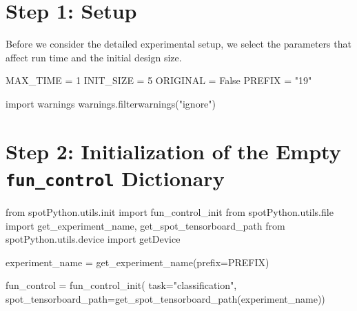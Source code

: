 \documentclass[
  letterpaper,
  DIV=11,
  numbers=noendperiod]{scrreprt}
\newenvironment{Shaded}{\begin{snugshade}}{\end{snugshade}}
\newcommand{\BuiltInTok}[1]{\textcolor[rgb]{0.00,0.23,0.31}{#1}}
\newcommand{\DecValTok}[1]{\textcolor[rgb]{0.68,0.00,0.00}{#1}}
\newcommand{\ImportTok}[1]{\textcolor[rgb]{0.00,0.46,0.62}{#1}}
\newcommand{\NormalTok}[1]{\textcolor[rgb]{0.00,0.23,0.31}{#1}}
\newcommand{\OperatorTok}[1]{\textcolor[rgb]{0.37,0.37,0.37}{#1}}
\newcommand{\StringTok}[1]{\textcolor[rgb]{0.13,0.47,0.30}{#1}}
\newcommand{\VariableTok}[1]{\textcolor[rgb]{0.07,0.07,0.07}{#1}}
\begin{document}
\hypertarget{sec-setup-19}{%
\section{Step 1: Setup}\label{sec-setup-19}}

Before we consider the detailed experimental setup, we select the
parameters that affect run time and the initial design size.

\begin{Shaded}
\begin{Highlighting}[]
\NormalTok{MAX\_TIME }\OperatorTok{=} \DecValTok{1}
\NormalTok{INIT\_SIZE }\OperatorTok{=} \DecValTok{5}
\NormalTok{ORIGINAL }\OperatorTok{=} \VariableTok{False}
\NormalTok{PREFIX }\OperatorTok{=} \StringTok{"19"}
\end{Highlighting}
\end{Shaded}

\begin{Shaded}
\begin{Highlighting}[]
\ImportTok{import}\NormalTok{ warnings}
\NormalTok{warnings.filterwarnings(}\StringTok{"ignore"}\NormalTok{)}
\end{Highlighting}
\end{Shaded}

\hypertarget{step-2-initialization-of-the-empty-fun_control-dictionary-4}{%
\section{\texorpdfstring{Step 2: Initialization of the Empty
\texttt{fun\_control}
Dictionary}{Step 2: Initialization of the Empty fun\_control Dictionary}}\label{step-2-initialization-of-the-empty-fun_control-dictionary-4}}

\begin{Shaded}
\begin{Highlighting}[]
\ImportTok{from}\NormalTok{ spotPython.utils.init }\ImportTok{import}\NormalTok{ fun\_control\_init}
\ImportTok{from}\NormalTok{ spotPython.utils.}\BuiltInTok{file} \ImportTok{import}\NormalTok{ get\_experiment\_name, get\_spot\_tensorboard\_path}
\ImportTok{from}\NormalTok{ spotPython.utils.device }\ImportTok{import}\NormalTok{ getDevice}

\NormalTok{experiment\_name }\OperatorTok{=}\NormalTok{ get\_experiment\_name(prefix}\OperatorTok{=}\NormalTok{PREFIX)}

\NormalTok{fun\_control }\OperatorTok{=}\NormalTok{ fun\_control\_init(}
\NormalTok{    task}\OperatorTok{=}\StringTok{"classification"}\NormalTok{,}
\NormalTok{    spot\_tensorboard\_path}\OperatorTok{=}\NormalTok{get\_spot\_tensorboard\_path(experiment\_name))}
\end{Highlighting}
\end{Shaded}
\end{document}
